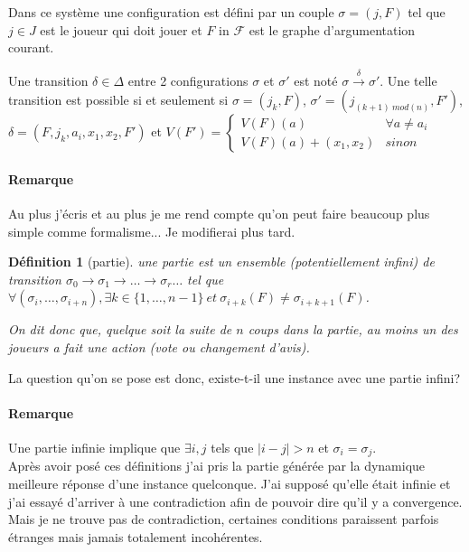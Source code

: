 \documentclass[12pt]{article}
\theoremstyle{defi}
\newtheorem{definition}{Définition}[section]
\theoremstyle{not}
\theoremstyle{prob}
\begin{document}
    Dans ce système une configuration est défini par un couple $\sigma =(j, F)$ tel que $j \in J$ est le joueur qui doit jouer et $F$ in $\mathcal{F}$ est le graphe d'argumentation courant.

    Une transition $\delta \in \Delta$ entre 2 configurations $\sigma$ et $\sigma'$ est noté $\sigma \overset{\delta}{\longrightarrow} \sigma'$. Une telle transition est possible si et seulement si $\sigma = (j_k, F)$, $\sigma' = (j_{(k+1)\ mod(n)}, F')$, $\delta = (F, j_k, a_i, x_1, x_2, F')$ et $V(F') = \left\lbrace \begin{array}{ll} V(F)(a) & \forall a \neq a_i \\ V(F)(a) + (x_1, x_2) & sinon \end{array} \right.$

    \paragraph{Remarque} Au plus j'écris et au plus je me rend compte qu'on peut faire beaucoup plus simple comme formalisme... Je modifierai plus tard.

    \begin{definition}[partie]
      une partie est un ensemble (potentiellement infini) de transition $\sigma_0 \longrightarrow \sigma_1 \longrightarrow \ldots \longrightarrow \sigma_r \ldots$
      tel que
      $\forall (\sigma_i, \ldots, \sigma_{i+n}), \exists k \in \{1, \ldots, n-1\}\ et\ \sigma_{i+k}(F) \neq \sigma_{i+k+1}(F)$.

      On dit donc que, quelque soit la suite de $n$ coups dans la partie, au moins un des joueurs a fait une action (vote ou changement d'avis).
  \end{definition}

  La question qu'on se pose est donc, existe-t-il une instance avec une partie infini?

  \paragraph{Remarque} Une partie infinie implique que $\exists i, j$ tels que $|i - j| > n$ et $\sigma_i = \sigma_j$.\\

  Après avoir posé ces définitions j'ai pris la partie générée par la dynamique meilleure réponse d'une instance quelconque. J'ai supposé qu'elle était infinie et j'ai essayé d'arriver à une contradiction afin de pouvoir dire qu'il y a convergence. Mais je ne trouve pas de contradiction, certaines conditions paraissent parfois étranges mais jamais totalement incohérentes.
\end{document}

